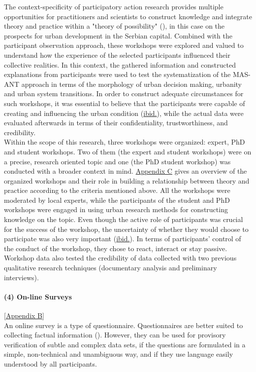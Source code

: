 \documentclass[11pt]{report}
\begin{document}
The context-specificity of participatory action research provides multiple opportunities for practitioners and scientists to construct knowledge and integrate theory  and  practice within a "theory of possibility" (\href{Mc}{\citealt{whyte_participatory_1991}}), in this case on the prospects for urban development in the Serbian capital. Combined with the participant observation approach, these workshops were explored and valued to understand how the experience of the selected participants influenced their collective realities. In this context, the gathered information and constructed explanations from participants were used to test the systematization of the MAS-ANT approach in terms of the morphology of urban decision making, urbanity and urban system transitions. In order to construct adequate circumstances for such workshops, it was essential to believe that the participants were capable of creating and influencing the urban condition (\href{Mc}{ibid.}), while the actual data were evaluated afterwards in terms of their confidentiality, trustworthiness, and credibility.
\\

Within the scope of this research, three workshops were organized: expert, PhD and student workshops. Two of them (the expert and student workshops) were on a precise, research oriented topic and one (the PhD student workshop) was conducted with a broader context in mind.
\href{Appendix C}{Appendix C} gives an overview of the organized workshops and their role in building a relationship between theory and practice according to the criteria mentioned above. All the workshops were moderated by local experts, while the participants of the student and PhD workshops were engaged in using urban research methods for constructing knowledge on the topic. Even though the active role of participants was crucial for the success of the workshop, the uncertainty of whether they would choose to participate was also very important (\href{Mc}{ibid.}).
In terms of participants’ control of the conduct of the workshop, they chose to react, interact or stay passive. Workshop data also tested the credibility of data collected with two previous qualitative research techniques (documentary analysis and preliminary interviews).

\paragraph{(4) On-line Surveys}
[\href{ref}{Appendix B}]
\\
An online survey is a type of questionnaire. Questionnaires are better suited to collecting factual information (\href{Payne}{\citealt{payne_key_2004}}). However, they can be used for provisory verification of subtle and complex data sets, if the questions are formulated in a simple, non-technical and unambiguous way, and if they use  language easily understood by all participants.
\\
\end{document}

